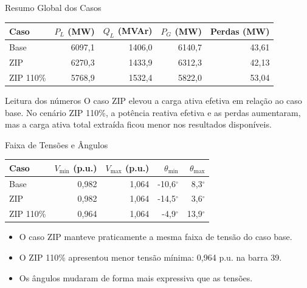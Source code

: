 \documentclass[aspectratio=169,11pt]{beamer}
\newcommand{\pu}{p.u.}
\begin{document}
\begin{frame}{Resumo Global dos Casos}
  \begin{table}
    \centering
    \small
    \begin{tabular}{lrrrr}
      \toprule
      Caso & $P_L$ (MW) & $Q_L$ (MVAr) & $P_G$ (MW) & Perdas (MW) \\
      \midrule
      Base & 6097,1 & 1406,0 & 6140,7 & 43,61 \\
      ZIP & 6270,3 & 1433,9 & 6312,3 & 42,13 \\
      ZIP 110\% & 5768,9 & 1532,4 & 5822,0 & 53,04 \\
      \bottomrule
    \end{tabular}
  \end{table}

  \vspace{0.15cm}
  \begin{block}{Leitura dos números}
    O caso ZIP elevou a carga ativa efetiva em relação ao caso base. No cenário ZIP 110\%, a potência reativa efetiva e as perdas aumentaram, mas a carga ativa total extraída ficou menor nos resultados disponíveis.
  \end{block}
\end{frame}

\begin{frame}{Faixa de Tensões e Ângulos}
  \begin{table}
    \centering
    \small
    \begin{tabular}{lrrrr}
      \toprule
      Caso & $V_{\min}$ (\pu) & $V_{\max}$ (\pu) & $\theta_{\min}$ & $\theta_{\max}$ \\
      \midrule
      Base & 0,982 & 1,064 & -10,6$^\circ$ & 8,3$^\circ$ \\
      ZIP & 0,982 & 1,064 & -14,5$^\circ$ & 3,6$^\circ$ \\
      ZIP 110\% & 0,964 & 1,064 & -4,9$^\circ$ & 13,9$^\circ$ \\
      \bottomrule
    \end{tabular}
  \end{table}

  \vspace{0.15cm}
  \begin{itemize}
    \item O caso ZIP manteve praticamente a mesma faixa de tensão do caso base.
    \item O ZIP 110\% apresentou menor tensão mínima: 0,964 \pu{} na barra 39.
    \item Os ângulos mudaram de forma mais expressiva que as tensões.
  \end{itemize}
\end{frame}
\end{document}
